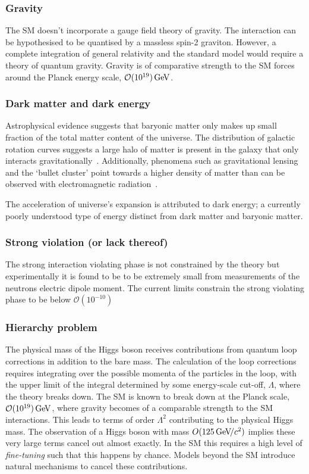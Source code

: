 \subsubsection{Gravity}
The SM doesn't incorporate a gauge field theory of gravity. The interaction can be hypothesised to be quantised by a massless spin-2 graviton. However, a complete integration of general relativity and the standard model would require a theory of quantum gravity. Gravity is of comparative strength to the SM forces around the Planck energy scale, $\mathcal{O}(10^{19})\mathrm{\,Ge\kern -0.1em V}$.    

\subsubsection{Dark matter and dark energy}
Astrophysical evidence suggests that baryonic matter only makes up small fraction of the total matter content of the universe. 
The distribution of galactic rotation curves suggests a large halo of matter is present in the galaxy that only interacts gravitationally~\cite{DMrotation}. Additionally, phenomena such as gravitational lensing and the `bullet cluster' point towards a higher density of matter than can be observed with electromagnetic radiation~\cite{0004-637X-604-2-596,0004-637X-606-2-819}. 

The acceleration of universe's expansion is attributed to dark energy; a currently poorly understood type of energy distinct from dark matter and baryonic matter.

\subsubsection{Strong \CP violation (or lack thereof)}  
The strong interaction \CP violating phase is not constrained by the theory but experimentally it is found to be to be extremely small from measurements of the neutrons electric dipole moment. The current limits constrain the strong \CP violating phase to be below $\mathcal{O}(10^{-10})$~\cite{Kuckei2007} 

\subsubsection{Hierarchy problem}

The physical mass of the Higgs boson receives contributions from quantum loop corrections in addition to the bare mass. The calculation of the loop corrections requires integrating over the possible momenta of the particles in the loop, with the upper limit of the integral determined by some energy-scale cut-off, $\Lambda$, where the theory breaks down. The SM is known to break down at the Planck scale, $\mathcal{O}(10^{19})\mathrm{\,Ge\kern -0.1em V}$, where gravity becomes of a comparable strength to the SM interactions. This leads to terms of order $\Lambda^{2}$ contributing to the physical Higgs mass. The observation of a Higgs boson with mass $O(125{\mathrm{\,Ge\kern -0.1em V\!/}c^2})$ implies these very large terms cancel out almost exactly. In the SM this requires a high level of \emph{fine-tuning} such that this happens by chance. Models beyond the SM introduce natural mechanisms to cancel these contributions. 


